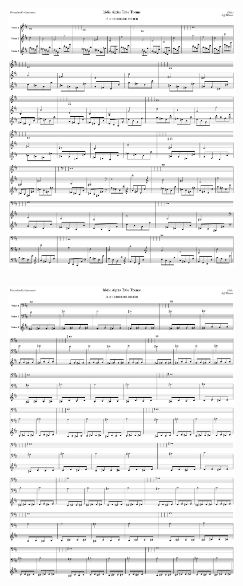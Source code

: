 \begin{figure}[H]                                             
{                                                             
  \setlength{\tabcolsep}{3.0pt}                               
  \setlength\cmidrulewidth{\heavyrulewidth} %
    \begin{subfigure}{0.5\textwidth}                            
  \includegraphics[width=6cm]{music/title_no_15_page_1001.png}%
    \end{subfigure}                                             
  \begin{subfigure}{0.5\textwidth}                            
  \includegraphics[width=6cm]{music/title_no_16_page_1001.png}%
    \end{subfigure}                                             
}                                                             
\end{figure}                                                  


